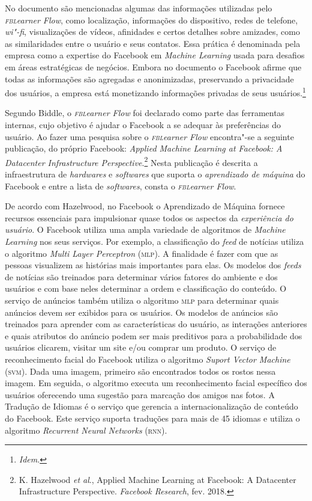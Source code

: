 No documento são mencionadas algumas das informações utilizadas pelo
\textit{\textsc{fbl}earner Flow}, como localização, informações do dispositivo,
redes de telefone, \textit{wi"-fi}, visualizações de vídeos, afinidades e certos
detalhes sobre amizades, como as similaridades entre o usuário e seus
contatos. Essa prática é denominada pela empresa como a expertise do
Facebook em \textit{Machine Learning} usada para desafios em áreas
estratégicas de negócios. Embora no documento o Facebook afirme que
todas as informações são agregadas e anonimizadas, preservando a
privacidade dos usuários, a empresa está monetizando informações
privadas de seus usuários.\footnote{\textit{Idem}.}

Segundo Biddle, o \textit{\textsc{fbl}earner Flow} foi declarado como
parte das ferramentas internas, cujo objetivo é ajudar o Facebook a se
adequar às preferências do usuário. Ao fazer uma pesquisa sobre o
\textit{\textsc{fbl}earner Flow} encontra"-se a seguinte publicação, do próprio
Facebook: \textit{Applied Machine Learning at Facebook: A Datacenter
Infrastructure Perspective}.\footnote{K. Hazelwood \textit{et al}., Applied Machine Learning at Facebook: A
Datacenter Infrastructure Perspective. \textit{Facebook Research}, fev. 2018.} Nesta
publicação é descrita a infraestrutura de \textit{hardwares} e \textit{softwares} que
suporta o \textit{aprendizado de máquina} do Facebook e entre a lista de
\textit{softwares}, consta o \textit{\textsc{fbl}earner Flow}.

De acordo com Hazelwood, no Facebook o Aprendizado de
Máquina fornece recursos essenciais para impulsionar quase todos os
aspectos da \textit{experiência do usuário}. O Facebook utiliza uma ampla
variedade de algoritmos de \textit{Machine Learning} nos seus serviços.
Por exemplo, a classificação do \textit{feed} de notícias utiliza o
algoritmo \textit{Multi Layer Perceptron} (\textsc{mlp}). A finalidade é fazer
com que as pessoas visualizem as histórias mais importantes para elas.
Os modelos dos \textit{feeds} de notícias são treinados para determinar
vários fatores do ambiente e dos usuários e com base neles determinar a
ordem e classificação do conteúdo. O serviço de anúncios também utiliza
o algoritmo \textsc{mlp} para determinar
quais anúncios devem ser exibidos para os usuários. Os modelos de
anúncios são treinados para aprender com as características do usuário,
as interações anteriores e quais atributos do anúncio podem ser mais
preditivos para a probabilidade dos usuários clicarem, visitar um site
e/ou comprar um produto. O serviço de reconhecimento facial do Facebook
utiliza o algoritmo \textit{Suport Vector Machine} (\textsc{svm}). Dada uma
imagem, primeiro são encontrados todos os rostos nessa imagem. Em
seguida, o algoritmo executa um reconhecimento facial específico dos
usuários oferecendo uma sugestão para marcação dos amigos nas fotos. A
Tradução de Idiomas é o serviço que gerencia a internacionalização de
conteúdo do Facebook. Este serviço suporta traduções para mais de 45
idiomas e utiliza o algoritmo \textit{Recurrent Neural Networks}
(\textsc{rnn}).

